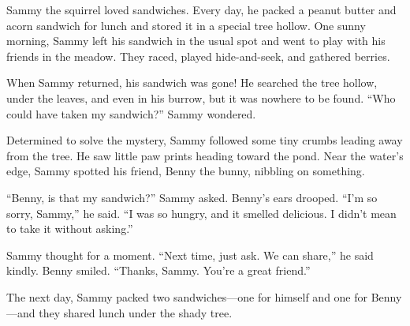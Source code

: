\documentclass[12pt]{article}
\begin{document}
\begin{tcolorbox}[colframe=black!60, colback=white, 
coltitle=black, colbacktitle=black!15, fonttitle=\bfseries\Large, 
title=Text: Sammy and the Missing Sandwich, halign title=center, left=10pt, right=10pt, top=10pt, bottom=15pt]
Sammy the squirrel loved sandwiches. Every day, he packed a peanut butter and acorn sandwich for lunch and stored it in a special tree hollow. One sunny morning, Sammy left his sandwich in the usual spot and went to play with his friends in the meadow. They raced, played hide-and-seek, and gathered berries.

When Sammy returned, his sandwich was gone! He searched the tree hollow, under the leaves, and even in his burrow, but it was nowhere to be found. “Who could have taken my sandwich?” Sammy wondered.

Determined to solve the mystery, Sammy followed some tiny crumbs leading away from the tree. He saw little paw prints heading toward the pond. Near the water’s edge, Sammy spotted his friend, Benny the bunny, nibbling on something.

“Benny, is that my sandwich?” Sammy asked. Benny’s ears drooped. “I’m so sorry, Sammy,” he said. “I was so hungry, and it smelled delicious. I didn’t mean to take it without asking.”

Sammy thought for a moment. “Next time, just ask. We can share,” he said kindly. Benny smiled. “Thanks, Sammy. You’re a great friend.”

The next day, Sammy packed two sandwiches—one for himself and one for Benny—and they shared lunch under the shady tree.

 



 

     \end{tcolorbox}
\end{document}
